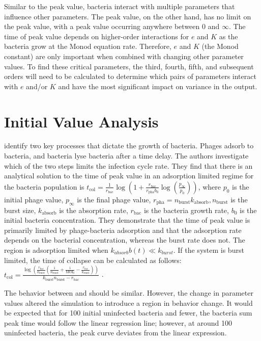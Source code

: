 Similar to the peak value, bacteria interact with multiple parameters that influence other parameters. 
The peak value, on the other hand, has no limit on the peak value, with a peak value occurring anywhere between 0 and $\infty$. 
The time of peak value depends on higher-order interactions for $e$ and $K$ as the bacteria grow at the Monod equation rate. Therefore, $e$ and $K$ (the Monod constant) are only important when combined with changing other parameter values. 
To find these critical parameters, the third, fourth, fifth, and subsequent orders will need to be calculated to determine which pairs of parameters interact with $e$ and/or $K$ and have the most significant impact on variance in the output. 

\section{Initial Value Analysis}
\citet{mullaExtremeDiversityPhage2024} identify two key processes that dictate the growth of bacteria. 
Phages adsorb to bacteria, and bacteria lyse bacteria after a time delay. 
The authors investigate which of the two steps limits the infection cycle rate. 
They find that there is an analytical solution to the time of peak value in an adsorption limited regime for the bacteria population is $t_{\text{col}} = \frac{1}{r_{\text{bac}}} \log\left(1 + \frac{r_{\text{bac}}}{r_{\text{pha}}b_0} \log\left(\frac{p_{\infty}}{p_0}\right)\right)$, where $p_0$ is the initial phage value, $p_\infty$ is the final phage value, $r_{\text{pha}} = n_{\text{burst}} k_{\text{absorb}}, n_{\text{burst}}$ is the burst size, $k_{\text{absorb}}$ is the absorption rate, $r_{\text{bac}}$ is the bacteria growth rate, $b_0$ is the initial bacteria concentration. 
They demonstrate that the time of peak value is primarily limited by phage-bacteria adsorption and that the adsorption rate depends on the bacterial concentration, whereas the burst rate does not. 
The region is adsorption limited when $k_{absorb}b(t) \ll k_{burst}$. 
If the system is burst limited, the time of collapse can be calculated as follows: $t_{\text{col}} = \frac{\log\left(\frac{r_{\text{bac}}}{k_{\text{burst}}}\left(\frac{1}{n_{\text{burst}}} + \frac{1}{\text{MOI}_0} - \frac{r_{\text{bac}}}{k_{\text{burst}}}\right)\right)}{k_{\text{burst}}n_{\text{burst}} - r_{\text{bac}}}$ \cite{mullaExtremeDiversityPhage2024}. 

The behavior between  and  should be similar. However, the change in parameter values altered the simulation to introduce a region in behavior change. 
It would be expected that for 100 initial uninfected bacteria and fewer, the bacteria sum peak time would follow the linear regression line; however, at around 100 uninfected bacteria, the peak curve deviates from the linear expression. 

